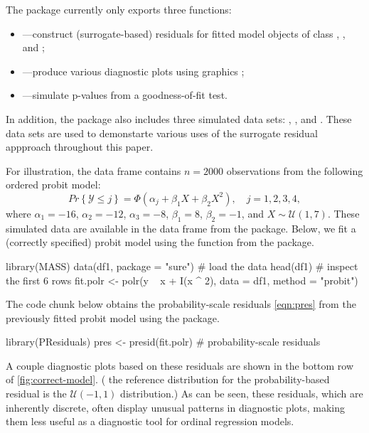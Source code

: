 The  package currently only exports three functions:
\begin{itemize}
  \item {}---construct (surrogate-based) residuals for fitted model objects of class , , and ;
  \item {}---produce various diagnostic plots using  graphics \citep{pkg-ggplot2};
 \item {}---simulate p-values from a goodness-of-fit test.
\end{itemize}
In addition, the package also includes three simulated data sets: , , and . These data sets are used to demonstarte various uses of the surrogate residual appproach throughout this paper.

For illustration, the data frame  contains $n = 2000$ observations from the following ordered probit model:
\begin{equation}
\label{eqn:quadratic}
  Pr\left\{\mathcal{Y} \le j\right\} = \Phi\left(\alpha_j + \beta_1 X + \beta_2 X ^ 2\right), \quad j = 1, 2, 3, 4,
\end{equation}
where $\alpha_1 = -16$, $\alpha_2 = -12$, $\alpha_3 = -8$, $\beta_1 = 8$, $\beta_2 = -1$, and $X \sim \mathcal{U}\left(1, 7\right)$. These simulated data are available in the  data frame from the  package. Below, we fit a (correctly specified) probit model using the  function from the  package.
\begin{example}
library(MASS)
data(df1, package = "sure")  # load the data
head(df1)  # inspect the first 6 rows
fit.polr <- polr(y ~ x + I(x ^ 2), data = df1, method = "probit")
\end{example}

The code chunk below obtains the probability-scale residuals \eqref{eqn:pres} from the previously fitted probit model  using the  package.
\begin{example}
library(PResiduals)
pres <- presid(fit.polr)  # probability-scale residuals
\end{example}
A couple diagnostic plots based on these residuals are shown in the bottom row of \ref{fig:correct-model}. ( the reference distribution for the probability-based residual is the $\mathcal{U}\left(-1, 1\right)$ distribution.) As can be seen, these residuals, which are inherently discrete, often display unusual patterns in diagnostic plots, making them less useful as a diagnostic tool for ordinal regression models.


